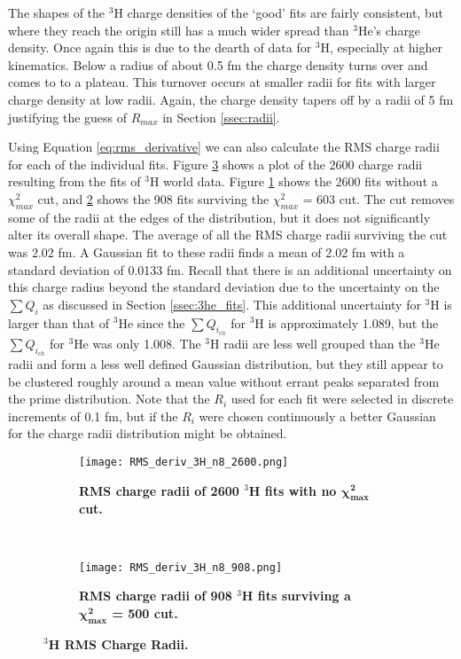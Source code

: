 The shapes of the $^3$H charge densities of the `good' fits are fairly consistent, but where they reach the origin still has a much wider spread than $^3$He's charge density. Once again this is due to the dearth of data for $^3$H, especially at higher kinematics. Below a radius of about 0.5 fm the charge density turns over and comes to to a plateau. This turnover occurs at smaller radii for fits with larger charge density at low radii. Again, the charge density tapers off by a radii of 5 fm justifying the guess of $R_{max}$ in Section \ref{ssec:radii}. %

Using Equation \ref{eq:rms_derivative} we can also calculate the RMS charge radii for each of the individual fits. Figure \ref{fig:3h_rms_deriv} shows a plot of the 2600 charge radii resulting from the fits of $^3$H world data. Figure \ref{fig:3h_rms_deriv_no_cut} shows the 2600 fits without a $\chi^2_{max}$ cut, and \ref{fig:3h_rms_deriv_cut} shows the 908 fits surviving the $\chi^2_{max}$ = 603 cut. The cut removes some of the radii at the edges of the distribution, but it does not significantly alter its overall shape. The average of all the RMS charge radii surviving the cut was 2.02 fm. A Gaussian fit to these radii finds a mean of 2.02 fm with a standard deviation of 0.0133 fm. Recall that there is an additional uncertainty on this charge radius beyond the standard deviation due to the uncertainty on the $\sum Q_i$ as discussed in Section \ref{ssec:3he_fits}. This additional uncertainty for $^3$H is larger than that of $^3$He since the $\sum Q_{i_{ch}}$ for $^3$H is approximately 1.089, but the $\sum Q_{i_{ch}}$ for $^3$He was only 1.008. The $^3$H radii are less well grouped than the $^3$He radii and form a less well defined Gaussian distribution, but they still appear to be clustered roughly around a mean value without errant peaks separated from the prime distribution. Note that the $R_i$ used for each fit were selected in discrete increments of 0.1 fm, but if the $R_i$ were chosen continuously a better Gaussian for the charge radii distribution might be obtained.%

\begin{figure}[!ht]
\begin{subfigure}{1.\textwidth}
  \centering
  \texttt{[image: RMS\_deriv\_3H\_n8\_2600.png]}
  \caption{\bf{RMS charge radii of 2600 $^3$H fits with no $\boldsymbol{\chi^2_{max}}$ cut}.}
  \label{fig:3h_rms_deriv_no_cut}
\end{subfigure}\\
\begin{subfigure}{1.\textwidth}
  \centering
  \texttt{[image: RMS\_deriv\_3H\_n8\_908.png]}
  \caption{\bf{RMS charge radii of 908 $^3$H fits surviving a $\boldsymbol{\chi^2_{max}}$ = 500 cut}.}
  \label{fig:3h_rms_deriv_cut}
\end{subfigure}
\caption[$^3$H RMS Charge Radii]{\bf{$^3$H RMS Charge Radii.}}
\label{fig:3h_rms_deriv}
\end{figure}

